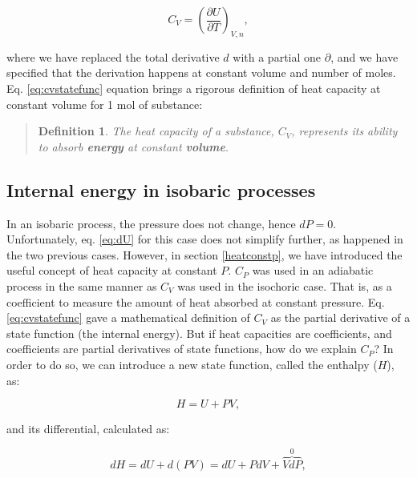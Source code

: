 \documentclass[
  9pt,
]{extbook}
\theoremstyle{definition}
\newtheorem{definition}{Definition}[chapter]
\theoremstyle{definition}
\theoremstyle{definition}
\theoremstyle{remark}
\begin{document}
\begin{equation}
  C_V = \left( \frac{\partial U} {\partial T} \right)_{V,n},
  \label{eq:cvstatefunc}
\end{equation}

where we have replaced the total derivative \(d\) with a partial one \(\partial\), and we have specified that the derivation happens at constant volume and number of moles. Eq. \eqref{eq:cvstatefunc} equation brings a rigorous definition of heat capacity at constant volume for 1 mol of substance:

\begin{quote}
\begin{definition}
\protect\hypertarget{def:newdefcv}{}{\label{def:newdefcv} }\emph{The heat capacity of a substance, \(C_V\), represents its ability to absorb \textbf{energy} at constant \textbf{volume}.}
\end{definition}
\end{quote}

\hypertarget{enthalpy}{%
\subsection{Internal energy in isobaric processes}\label{enthalpy}}

In an isobaric process, the pressure does not change, hence \(dP=0\). Unfortunately, eq. \eqref{eq:dU} for this case does not simplify further, as happened in the two previous cases. However, in section \ref{heatconstp}, we have introduced the useful concept of heat capacity at constant \(P\). \(C_P\) was used in an adiabatic process in the same manner as \(C_V\) was used in the isochoric case. That is, as a coefficient to measure the amount of heat absorbed at constant pressure. Eq. \eqref{eq:cvstatefunc} gave a mathematical definition of \(C_V\) as the partial derivative of a state function (the internal energy). But if heat capacities are coefficients, and coefficients are partial derivatives of state functions, how do we explain \(C_P\)? In order to do so, we can introduce a new state function, called the enthalpy (\(H\)), as:

\begin{equation}
  H = U + PV,
  \label{eq:enthalpydef}
\end{equation}

and its differential, calculated as:

\begin{equation}
  dH = dU + d(PV) = dU + PdV + \overbrace{VdP}^{0},
  \label{eq:enthalpydefdiff}
\end{equation}
\end{document}
